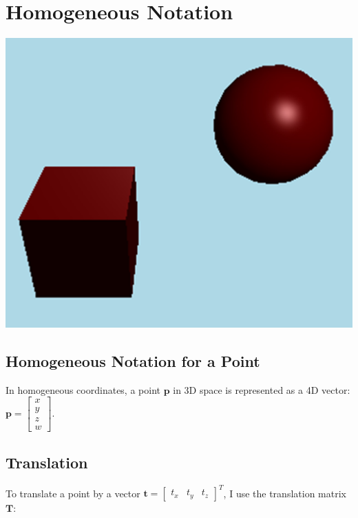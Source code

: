 \documentclass{article}
\begin{document}
	
	\section{Homogeneous Notation}
	
	\begin{center} \includegraphics[width=1\textwidth]{homogenious_notation_images/transformation_all.jpg}  \end{center}
	
	\subsection{Homogeneous Notation for a Point}
	In homogeneous coordinates, a point \(\bm{p}\) in 3D space is represented as a 4D vector: \(\bm{p} = \begin{bmatrix} x \\ y \\ z \\ w \end{bmatrix}\).
	
	\subsection{Translation}
	To translate a point by a vector \(\bm{t} = \begin{bmatrix} t_x & t_y & t_z \end{bmatrix}^T\), I use the translation matrix \(\bm{T}\):
	
\end{document}
